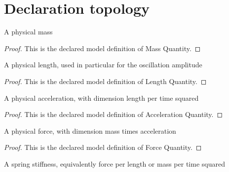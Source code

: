 \section{Declaration topology}
\begin{definition}
  \label{def:physics:phyx-mini-0258:phyxminiproblems-problemphyxmini0258-massquantity}
  A physical mass
\end{definition}
\begin{proof}
  This is the declared model definition of Mass Quantity.
\end{proof}
\begin{definition}
  \label{def:physics:phyx-mini-0258:phyxminiproblems-problemphyxmini0258-lengthquantity}
  A physical length, used in particular for the oscillation amplitude
\end{definition}
\begin{proof}
  This is the declared model definition of Length Quantity.
\end{proof}
\begin{definition}
  \label{def:physics:phyx-mini-0258:phyxminiproblems-problemphyxmini0258-accelerationquantity}
  A physical acceleration, with dimension length per time squared
\end{definition}
\begin{proof}
  This is the declared model definition of Acceleration Quantity.
\end{proof}
\begin{definition}
  \label{def:physics:phyx-mini-0258:phyxminiproblems-problemphyxmini0258-forcequantity}
  A physical force, with dimension mass times acceleration
\end{definition}
\begin{proof}
  This is the declared model definition of Force Quantity.
\end{proof}
\begin{definition}
  \label{def:physics:phyx-mini-0258:phyxminiproblems-problemphyxmini0258-springstiffnessquantity}
  A spring stiffness, equivalently force per length or mass per time squared
\end{definition}
